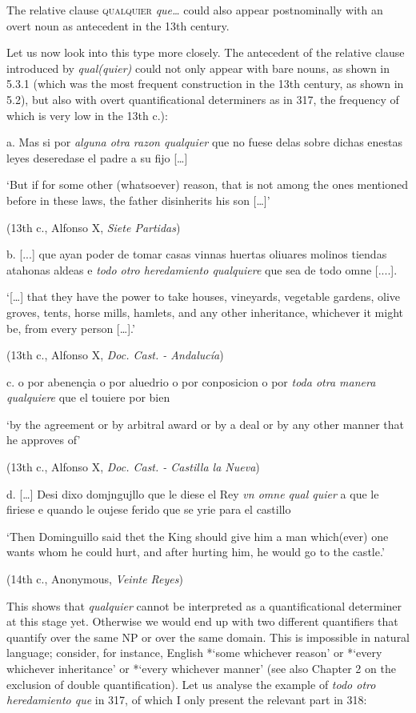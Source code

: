 \documentclass[output=paper]{langscibook}
\begin{document}
The relative clause \textsc{qualquier} \textit{que…} could also appear postnominally with an overt noun as antecedent in the 13th century.

  Let us now look into this type more closely. The antecedent of the relative clause introduced by \textit{qual(quier)} could not only appear with bare nouns, as shown in 5.3.1 (which was the most frequent construction in the 13th century, as shown in 5.2), but also with overt quantificational determiners as in 317, the frequency of which is very low in the 13th c.):

  a.  Mas si por \textit{alguna otra razon qualquier} que no fuese delas sobre dichas enestas leyes deseredase el padre a su fijo […]

    ‘But if for some other (whatsoever) reason, that is not among the ones mentioned before in these laws, the father disinherits his son […]’

    (13th c., Alfonso X, \textit{Siete Partidas})

  b.  [...] que ayan poder de tomar casas vinnas huertas oliuares molinos tiendas atahonas aldeas e \textit{todo otro heredamiento qualquiere} que sea de todo omne [....]. 

    ‘[…] that they have the power to take houses, vineyards, vegetable gardens, olive groves, tents, horse mills, hamlets, and any other inheritance, whichever it might be, from every person […].’

    (13th c., Alfonso X, \textit{Doc. Cast. - Andalucía})

  c.  o por abenençia o por aluedrio o por conposicion o por \textit{toda otra manera qualquiere} que el touiere por bien 

    ‘by the agreement or by arbitral award or by a deal or by any other manner that he approves of’

    (13th c., Alfonso X, \textit{Doc. Cast. - Castilla la Nueva})

  d.  […] Desi dixo domjngujllo que le diese el Rey \textit{vn omne qual quier} a que le firiese e quando le oujese ferido que se yrie para el castillo 

    ‘Then Dominguillo said thet the King should give him a man which(ever) one wants whom he could hurt, and after hurting him, he would go to the castle.’

    (14th c., Anonymous, \textit{Veinte Reyes})

This shows that \textit{qualquier} cannot be interpreted as a quantificational determiner at this stage yet. Otherwise we would end up with two different quantifiers that quantify over the same NP or over the same domain. This is impossible in natural language; consider, for instance, English *‘some whichever reason’ or *‘every whichever inheritance’ or *‘every whichever manner’ (see also Chapter 2 on the exclusion of double quantification). Let us analyse the example of \textit{todo otro heredamiento que} in 317, of which I only present the relevant part in 318:
\end{document}
